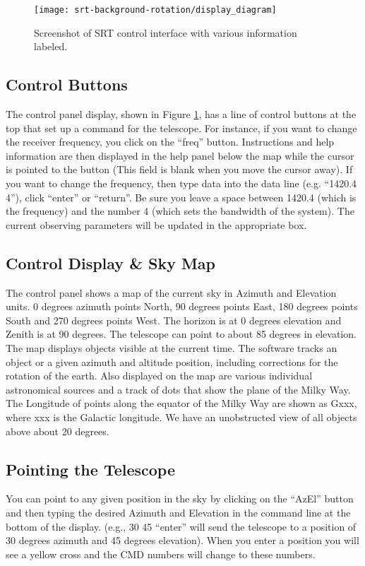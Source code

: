 \begin{figure}
	\centering
	\texttt{[image: srt-background-rotation/display\_diagram]}
	\caption{Screenshot of SRT control interface with various information labeled.}\label{sbr:fig:srt-display}
\end{figure}

\subsection{Control Buttons}
The control panel display, shown in Figure \ref{sbr:fig:srt-display}, has a line of control buttons at the top that set
up a command for the telescope. For instance, if you want to change the receiver
frequency, you click on the “freq” button. Instructions and help information are
then displayed in the help panel below the map while the cursor is pointed to the
button (This field is blank when you move the cursor away). If you want to
change the frequency, then type data into the data line (e.g. “1420.4 4”), click
“enter” or “return”. Be sure you leave a space between 1420.4 (which is the
frequency) and the number 4 (which sets the bandwidth of the system). The
current observing parameters will be updated in the appropriate box.

\subsection{Control Display \& Sky Map}
The control panel shows a map of the current sky in Azimuth and
Elevation units. 0 degrees azimuth points North, 90 degrees points East, 180
degrees points South and 270 degrees points West. The horizon is at 0 degrees
elevation and Zenith is at 90 degrees. The telescope can point to about 85
degrees in elevation.
The map displays objects visible at the current time. The software tracks
an object or a given azimuth and altitude position, including corrections for the
rotation of the earth. Also displayed on the map are various individual
astronomical sources and a track of dots that show the plane of the Milky Way.
The Longitude of points along the equator of the Milky Way are shown as Gxxx,
where xxx is the Galactic longitude. We have an unobstructed view of all objects
above about 20 degrees.

\subsection{Pointing the Telescope}
You can point to any given position in the sky by clicking on the “AzEl”
button and then typing the desired Azimuth and Elevation in the command line at
the bottom of the display. (e.g., 30 45 “enter” will send the telescope to a position
of 30 degrees azimuth and 45 degrees elevation). When you enter a position you
will see a yellow cross and the CMD numbers will change to these numbers. 

